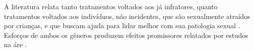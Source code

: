 
A literatura relata tanto tratamentos voltados aos já infratores, quanto tratamentos voltados aos indivíduos, não incidentes, que são sexualmente atraídos por crianças, e que buscam ajuda para lidar melhor com sua patologia sexual \cite{finkelhor2009prevention}. Esforços de ambos os gêneros produzem efeitos promissores relatados por estudos na áre \cite{mendelson2015parent}.



